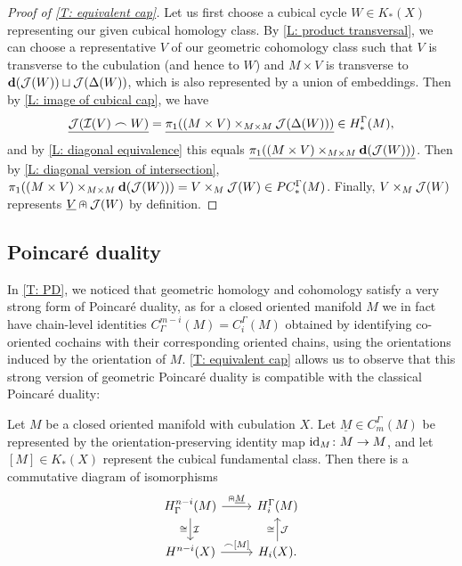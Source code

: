 \begin{proof}[Proof of \cref{T: equivalent cap}]
	Let us first choose a cubical cycle $W \in K_*(X)$ representing our given cubical homology class.
	By \cref{L: product transversal}, we can choose a representative $V$ of our geometric cohomology class such that $V$ is transverse to the cubulation (and hence to $W$) and $M \times V$ is transverse to $\mathbf{d}(\mathcal{J}(W)) \sqcup \mathcal{J}(\Delta(W))$, which is also represented by a union of embeddings.
	Then by \cref{L: image of cubical cap}, we have
	$$\underline{\mathcal{J}(\mathcal{I}(V)\frown W)} = \underline{\pi_1( (M \times V)\times_{M \times M}\mathcal{J}(\Delta(W)))} \in H_*^\Gamma(M),$$
	and by \cref{L: diagonal equivalence} this equals $\underline{\pi_1((M \times V)\times_{M \times M} \mathbf{d}(\mathcal{J}(W)))}$.
	Then by \cref{L: diagonal version of intersection},
	$\pi_1((M \times V)\times_{M \times M} \mathbf{d}(\mathcal{J}(W))) = V \times_M \mathcal{J}(W) \in PC_*^\Gamma(M)$.
	Finally, $V \times_M \mathcal{J}(W)$ represents $\underline{V}\nplus \mathcal{J}(W)$ by definition.
\end{proof}

\subsection{Poincar\'e duality}\label{S: PD}

In \cref{T: PD}, we noticed that geometric homology and cohomology satisfy a very strong form of Poincar\'e duality, as for a closed oriented manifold $M$ we in fact have chain-level identities $C^{m-i}_\Gamma(M) = C_i^\Gamma(M)$ obtained by identifying co-oriented cochains with their corresponding oriented chains, using the orientations induced by the orientation of $M$.
\cref{T: equivalent cap} allows us to observe that this strong version of geometric Poincar\'e duality is compatible with the classical Poincar\'e duality:

\begin{corollary}\label{C: PD}
	Let $M$ be a closed oriented manifold with cubulation $X$.
	Let $\underline M \in C_m^\Gamma(M)$ be represented by the orientation-preserving identity map $\mathrm{id}_M \colon M \to M$, and let $[M] \in K_*(X)$ represent the cubical fundamental class.
	Then there is a commutative diagram of isomorphisms
	\[
	\begin{tikzcd}
		H^{n-i}_\Gamma(M) \arrow{r}{\nplus \uM} \arrow[d, "\mc I","\cong"'] & H_i^\Gamma(M) \\
		H^{n-i}(X) \arrow{r}{\frown [M]} & H_i(X). \arrow[u, "\mc J"',,"\cong"]
	\end{tikzcd}
	\]
\end{corollary}

